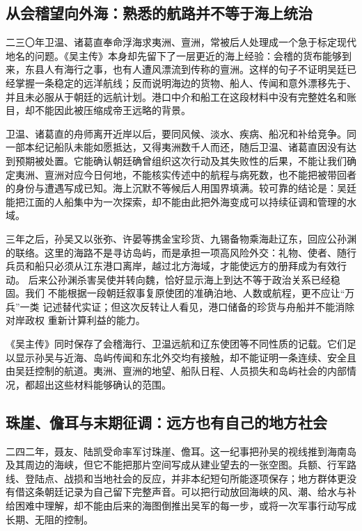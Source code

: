 \subsection{从会稽望向外海：熟悉的航路并不等于海上统治}

二三〇年卫温、诸葛直奉命浮海求夷洲、亶洲，常被后人处理成一个急于标定现代
地名的问题。《吴主传》本身却先留下了一层更近的海上经验：会稽的货布能够到
来，东县人有海行之事，也有人遭风漂流到传称的亶洲。这样的句子不证明吴廷已
经掌握一条稳定的远洋航线；反而说明海边的货物、船人、传闻和意外漂移先于、
并且未必服从于朝廷的远航计划。港口中介和船工在这段材料中没有完整姓名和账
目，却不能因此被压缩成帝王远略的背景。

卫温、诸葛直的舟师离开近岸以后，要同风候、淡水、疾病、船况和补给竞争。同
一部本纪记船队未能如愿抵达，又得夷洲数千人而还，随后卫温、诸葛直因没有达
到预期被处置。它能确认朝廷确曾组织这次行动及其失败性的后果，不能让我们确
定夷洲、亶洲对应今日何地，不能核实传述中的航程与病死数，也不能把被带回者
的身份与遭遇写成已知。海上沉默不等候后人用国界填满。较可靠的结论是：吴廷
能把江面的人船集中为一次探索，却不能由此把外海变成可以持续征调和管理的水
域。

三年之后，孙吴又以张弥、许晏等携金宝珍货、九锡备物乘海赴辽东，回应公孙渊
的联络。这里的海路不是寻访岛屿，而是承担一项高风险外交：礼物、使者、随行
兵员和船只必须从江东港口离岸，越过北方海域，才能使远方的册拜成为有效行动。
后来公孙渊杀害吴使并转向魏，恰好显示海上到达不等于政治关系已经稳固。我们
不能根据一段朝廷叙事复原使团的准确泊地、人数或航程，更不应让“万兵”一类
记述替代实证；但这次反转让人看见，港口储备的珍货与舟船并不能消除对岸政权
重新计算利益的能力。

\begin{sourcenote}
《吴主传》同时保存了会稽海行、卫温远航和辽东使团等不同性质的记载。它们足
以显示孙吴与近海、岛屿传闻和东北外交均有接触，却不能证明一条连续、安全且
由吴廷控制的航道。夷洲、亶洲的地望、船队日程、人员损失和岛屿社会的内部情
况，都超出这些材料能够确认的范围。
\end{sourcenote}

\subsection{珠崖、儋耳与末期征调：远方也有自己的地方社会}

二四二年，聂友、陆凯受命率军讨珠崖、儋耳。这一纪事把孙吴的视线推到海南岛
及其周边的海峡，但它不能把那片空间写成从建业望去的一张空图。兵额、行军路
线、登陆点、战损和当地社会的反应，并非本纪短句所能逐项保存；地方群体更没
有借这条朝廷记录为自己留下完整声音。可以把行动放回海峡的风、潮、给水与补
给困难中理解，却不能由后来的海图倒推出吴军的每一步，或将一次军事行动写成
长期、无阻的控制。

